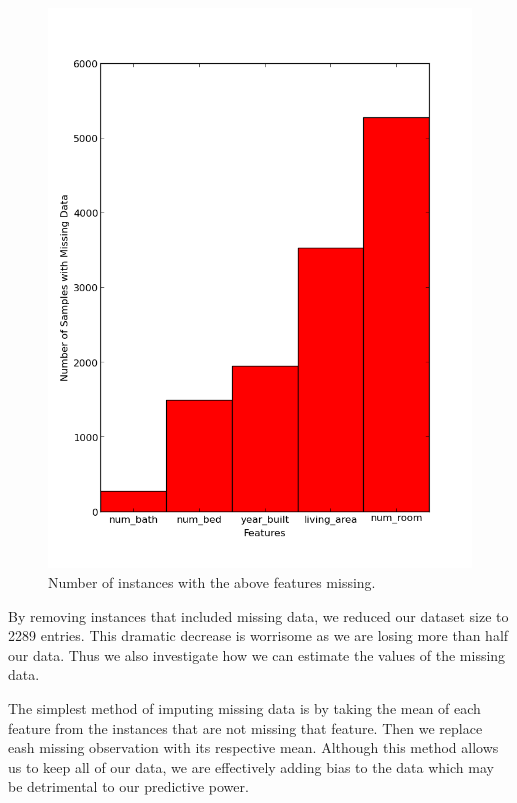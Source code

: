 \documentclass{acm_proc_article-sp}
\begin{document}
	\begin{figure}[h!]
   		\centering
  		\includegraphics[width=\linewidth]{missing_data.png}
    		\caption{Number of instances with the above features missing. }
    		\label{fig:missingdata}
	\end{figure}
	
	By removing instances that included missing data, we reduced our dataset size to 2289 entries. This dramatic decrease is worrisome as we are losing more than half our data. Thus we also investigate how we can estimate the values of the missing data.

	The simplest method of imputing missing data is by taking the mean of each feature from the instances that are not missing that feature. Then we replace eash missing observation with its respective mean. Although this method allows us to keep all of our data, we are effectively adding bias to the data which may be detrimental to our predictive power.
	
\end{document}
